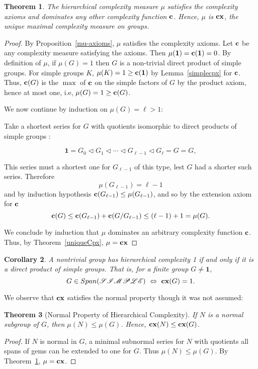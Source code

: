 \documentclass[a4paper,11pt]{amsart}
\newtheorem{theorem}{Theorem}[section]
\newtheorem{corollary}[theorem]{Corollary}
\theoremstyle{definition}
\newcommand{\cx}{\mbox{\bf cx}}
\renewcommand{\c}{\mbox{\bf c}}
\newcommand{\1}{{\mathbf 1}}
\newcommand{\SIMPLE}{{\mathscr{SIMPLE}}}
\newcommand{\Span}{Span}
\begin{document}
\begin{theorem}\label{mucpx}
The hierarchical complexity measure $\mu$ satisfies the complexity axioms and dominates any other complexity function $\c$.   Hence, $\mu$ is $\cx$, the unique maximal complexity measure on groups.
\end{theorem}
\begin{proof} 
By Proposition~\ref{mu-axioms}, $\mu$ satisfies the complexity axioms. Let $\c$ be any complexity measure satisfying the axioms. 
Then $\mu(\1)=\c(\1)=0$.   By definition of $\mu$,  if $\mu(G)=1$ then $G$ is a non-trivial direct product of simple groups.  For simple groups $K$, $\mu(K)=1 \geq \c(\1)$ by Lemma~\ref{simplecpx} for $\c$.  Thus,  $\c(G)$ is the $\max$ of $\c$ on the simple factors of $G$ by the product axiom, hence at most one, i.e, $\mu(G)=1\geq \c(G)$.


We now continue by induction on $\mu(G)=\ell > 1$:

Take a shortest series for $G$ with quotients isomorphic to direct products of simple groups :

$$\1 =G_0 \lhd G_1 \lhd \cdots \lhd G_{\ell-1} \lhd G_{\ell}=G =G,$$

This series must a shortest one for $G_{\ell-1}$ of this type, lest $G$ had a shorter such series. Therefore $$\mu(G_{\ell-1})=\ell-1$$
and by induction hypothesis
$\c(G_{\ell-1})\leq \mu(G_{\ell-1})$, and so by the extension axiom for $\c$
$$\c(G) \leq \c(G_{\ell-1})+\c(G/G_{\ell-1}) \leq (\ell-1)+1 =\mu(G).$$ 

We conclude by induction that $\mu$ dominates an arbitrary complexity function $\c$. Thus, by  Theorem~\ref{uniqueCpx}, $\mu=\cx$
\end{proof}
 
\begin{corollary} A nontrivial group has hierarchical complexity 1 if and only if it is a direct product of simple groups. That is, for a finite group $G\neq \1$, $$G \in \Span(\SIMPLE) \, \,  \Leftrightarrow \, \, \cx(G)=1.$$
\end{corollary}

\noindent We observe that $\cx$ satisfies the normal property though it was not assumed: 
\begin{theorem}[Normal Property of Hierarchical Complexity]\label{cpxNorm}
If $N$ is a normal subgroup of $G$, then $\mu(N)\leq \mu(G)$. Hence, $\cx(N)\leq \cx(G)$. 
\end{theorem}
\begin{proof}
If $N$ is normal in $G$, a minimal subnormal series for $N$ with quotients all spans of gems can be extended to one for $G$. Thus $\mu(N) \leq \mu(G)$.  By Theorem~\ref{mucpx}, $\mu=\cx$. 
\end{proof}
\end{document}
